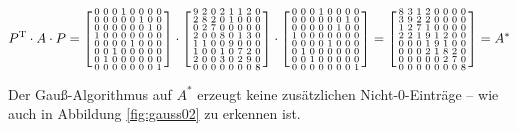 \[ P^{\textnormal{T}} \cdot A \cdot P =
	\left[
		\begin{smallmatrix}
			0&0&0&1&0&0&0&0\\
			0&0&0&0&0&1&0&0\\
			0&0&0&0&0&0&1&0\\
			1&0&0&0&0&0&0&0\\
			0&0&0&0&1&0&0&0\\
			0&0&1&0&0&0&0&0\\
			0&1&0&0&0&0&0&0\\
			0&0&0&0&0&0&0&1
		\end{smallmatrix}
		\right] \cdot
	\left[
		\begin{smallmatrix}
			9&2&0&2&1&1&2&0\\
			2&8&2&0&1&0&0&0\\
			0&2&7&0&0&0&0&0\\
			2&0&0&8&0&1&3&0\\
			1&1&0&0&9&0&0&0\\
			1&0&0&1&0&7&2&0\\
			2&0&0&3&0&2&9&0\\
			0&0&0&0&0&0&0&8
		\end{smallmatrix}
		\right] \cdot
	\left[
		\begin{smallmatrix}
			0&0&0&1&0&0&0&0\\
			0&0&0&0&0&0&1&0\\
			0&0&0&0&0&1&0&0\\
			1&0&0&0&0&0&0&0\\
			0&0&0&0&1&0&0&0\\
			0&1&0&0&0&0&0&0\\
			0&0&1&0&0&0&0&0\\
			0&0&0&0&0&0&0&1
		\end{smallmatrix}
		\right]
	=
	\left[
		\begin{smallmatrix}
			8&3&1&2&0&0&0&0\\
			3&9&2&2&0&0&0&0\\
			1&2&7&1&0&0&0&0\\
			2&2&1&9&1&2&0&0\\
			0&0&0&1&9&1&0&0\\
			0&0&0&2&1&8&2&0\\
			0&0&0&0&0&2&7&0\\
			0&0&0&0&0&0&0&8
		\end{smallmatrix}
		\right]
	= A^{\ast}
\]

Der Gauß-Algorithmus auf \( A ^ {\ast} \) erzeugt keine zusätzlichen Nicht-\( 0 \)-Einträge -- wie auch in Abbildung \ref{fig:gauss02} zu erkennen ist.

